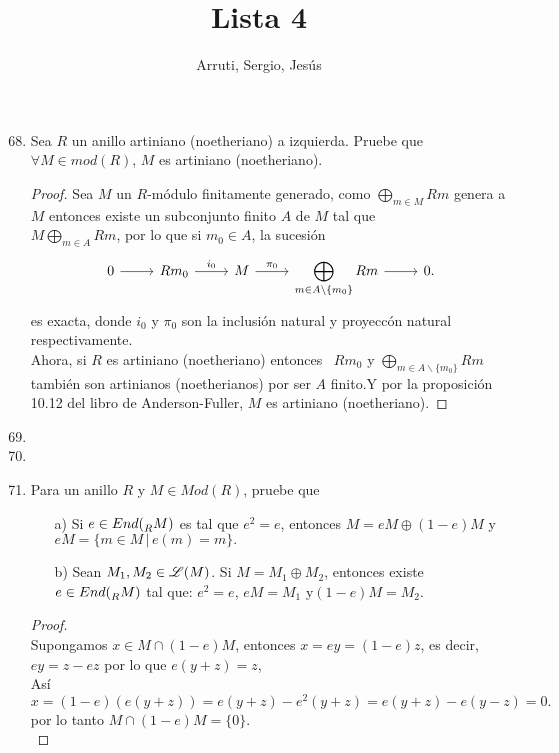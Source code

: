 \documentclass{article}
\title{Lista 4}
\author{Arruti, Sergio, Jesús}
\date{}
\begin{document}
	\maketitle
	\begin{enumerate}[label=\textbf{Ej \arabic*.}]
		\setcounter{enumi}{67}
\item
Sea $R$ un anillo artiniano (noetheriano) a izquierda. Pruebe que \\ $\forall M\in mod(R)$, $M$ es artiniano (noetheriano).
\begin{proof}
Sea $M$ un $R$-módulo finitamente generado, como $\displaystyle\bigoplus_{m\in M}Rm$ genera a $M$ entonces existe un subconjunto finito 
$A$ de $M$ tal que \\ $M\displaystyle\bigoplus_{m\in A}Rm$, por lo que si $m_0\in A$, la sucesión \[
\begin{tikzcd}
 0   \arrow{r}{}& R{m_0} \arrow{r}{i_0} & M\arrow{r}{\pi_0} &\arrow{r}{} \displaystyle\bigoplus_{m\in A\backslash \{m_0\}}Rm &0.
\end{tikzcd}
\]
es exacta, donde $i_0$ y $\pi_0$ son la inclusión natural y proyeccón natural respectivamente.\\
Ahora, si $R$ es artiniano (noetheriano) entonces \,\,\,$R{m_0}$ y $ \displaystyle\bigoplus_{m\in A\backslash \{m_0\}}Rm$ \,\,\,también son 
artinianos (noetherianos) por ser $A$ finito.Y por la proposición 10.12 del libro de Anderson-Fuller, $M$ es artiniano (noetheriano).
\end{proof}

\item
\item
\item Para un anillo $R$ y $M\in Mod(R)$, pruebe que 
\begin{itemize}
\item[a)] Si $e\in End(\prescript{}{R}{M})$ es tal que $e^2=e$, entonces $M=eM\oplus (1-e)M$ y $eM=\{m\in M\,|\, e(m)=m\}.$
\item[b)] Sean $M_1,M_2\in \mathscr{L}(M)$. Si $M=M_1\oplus M_2$, entonces existe\\ $e\in End(\prescript{}{R}{M})$ tal que: $e^2=e$, $eM=M_1$\quad
y\quad $(1-e)M=M_2$.
\end{itemize}
\begin{proof}

\\
Supongamos $x\in M\cap(1-e)M$, entonces $x=ey=(1-e)z$, es decir, $ey=z-ez$ por lo que $e(y+z)=z$,\\
Así \[x=(1-e)(e(y+z))=e(y+z)-e^2(y+z)=e(y+z)-e(y-z)=0.
\]
por lo tanto $M\cap (1-e)M=\{0\}.$\\


\end{proof}
\end{enumerate}
\end{document}

